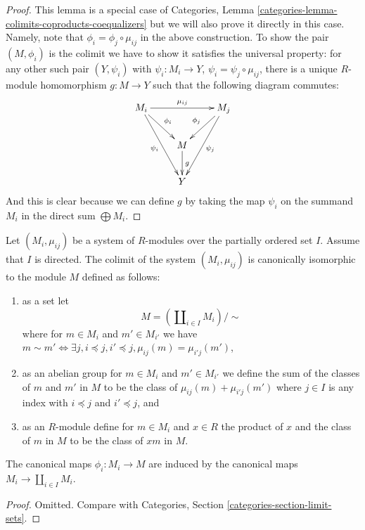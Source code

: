 \begin{proof}
This lemma is a special case of
Categories, Lemma \ref{categories-lemma-colimits-coproducts-coequalizers}
but we will also prove it directly in this case.
Namely, note that $\phi_{i} = \phi_{j}\circ \mu_{ij}$ in the above
construction. To show the pair $(M, \phi_{i})$ is the colimit we have
to show it satisfies the universal property: for any other such pair
$(Y, \psi_{i})$ with $\psi_{i} : M_i\rightarrow
Y$, $\psi_{i} = \psi_{j}\circ \mu_{ij}$, there is a unique $R$-module
homomorphism $g : M\rightarrow Y$ such that the
following diagram commutes:
$$
\xymatrix{
M_i \ar[rr]^{\mu_{ij}} \ar[dr]^{\phi_{i}} \ar[ddr]_{\psi_{i}} & &
M_j\ar[dl]_{\phi_{j}} \ar[ddl]^{\psi_{j}} \\
& M \ar[d]^{g}\\
& Y
}
$$
And this is clear because we can define $g$ by taking the
map $\psi_i$ on the summand $M_i$ in the direct sum
$\bigoplus M_i$.
\end{proof}

\begin{lemma}
\label{lemma-directed-colimit}
Let $(M_i, \mu_{ij})$ be a system of $R$-modules over the
partially ordered set $I$. Assume that $I$ is directed.
The colimit of the system $(M_i, \mu_{ij})$ is canonically
isomorphic to the module $M$ defined as follows:
\begin{enumerate}
\item as a set let
$$
M = (\coprod\nolimits_{i \in I} M_i)/\sim
$$
where for $m \in M_i$ and $m' \in M_{i'}$ we have
$m \sim m' \Leftrightarrow \exists j, i \preceq j, i' \preceq j,
\mu_{ij}(m) = \mu_{i'j}(m')$,
\item as an abelian group for $m \in M_i$ and $m' \in M_{i'}$
we define the sum of the classes of $m$ and $m'$ in $M$
to be the class of $\mu_{ij}(m) + \mu_{i'j}(m')$ where
$j \in I$ is any index with $i \preceq j$ and $i' \preceq j$, and
\item as an $R$-module define for $m \in M_i$ and $x \in R$
the product of $x$ and the class of $m$ in $M$ to be the
class of $xm$ in $M$.
\end{enumerate}
The canonical maps $\phi_i : M_i \to M$ are induced by the canonical
maps $M_i \to \coprod_{i \in I} M_i$.
\end{lemma}

\begin{proof}
Omitted. Compare with
Categories, Section \ref{categories-section-limit-sets}.
\end{proof}

